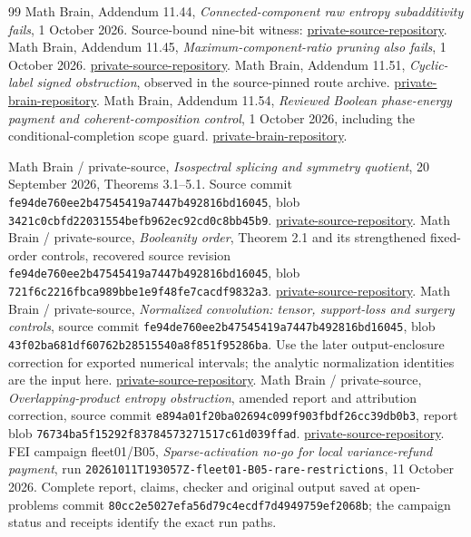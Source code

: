 \documentclass[11pt]{article}
\begin{document}
\begin{thebibliography}{99}
 Math Brain, Addendum 11.44, \emph{Connected-component raw entropy subadditivity fails}, 1 October 2026. Source-bound nine-bit witness: \url{private-source-repository}.
 Math Brain, Addendum 11.45, \emph{Maximum-component-ratio pruning also fails}, 1 October 2026. \url{private-source-repository}.
 Math Brain, Addendum 11.51, \emph{Cyclic-label signed obstruction}, observed in the source-pinned route archive. \url{private-brain-repository}.
 Math Brain, Addendum 11.54, \emph{Reviewed Boolean phase-energy payment and coherent-composition control}, 1 October 2026, including the conditional-completion scope guard. \url{private-brain-repository}.

 Math Brain / private-source,
\emph{Isospectral splicing and symmetry quotient},
20 September 2026, Theorems 3.1--5.1.
Source commit \texttt{fe94de760ee2b47545419a7447b492816bd16045},
blob \texttt{3421c0cbfd22031554befb962ec92cd0c8bb45b9}.
\url{private-source-repository}.
 Math Brain / private-source,
\emph{Booleanity order}, Theorem 2.1 and its strengthened
fixed-order controls, recovered source revision
\texttt{fe94de760ee2b47545419a7447b492816bd16045},
blob \texttt{721f6c2216fbca989bbe1e9f48fe7cacdf9832a3}.
\url{private-source-repository}.
 Math Brain / private-source,
\emph{Normalized convolution: tensor, support-loss and surgery controls},
source commit \texttt{fe94de760ee2b47545419a7447b492816bd16045},
blob \texttt{43f02ba681df60762b28515540a8f851f95286ba}.
Use the later output-enclosure correction for exported numerical
intervals; the analytic normalization identities are the input here.
\url{private-source-repository}.
 Math Brain / private-source,
\emph{Overlapping-product entropy obstruction}, amended report
and attribution correction, source commit
\texttt{e894a01f20ba02694c099f903fbdf26cc39db0b3},
report blob \texttt{76734ba5f15292f83784573271517c61d039ffad}.
\url{private-source-repository}.
 FEI campaign fleet01/B05,
\emph{Sparse-activation no-go for local variance-refund payment},
run \texttt{20261011T193057Z-fleet01-B05-rare-restrictions},
11 October 2026. Complete report, claims, checker and original
output saved at open-problems commit
\texttt{80cc2e5027efa56d79c4ecdf7d4949759ef2068b};
the campaign status and receipts identify the exact run paths.

\end{thebibliography}
\end{document}
